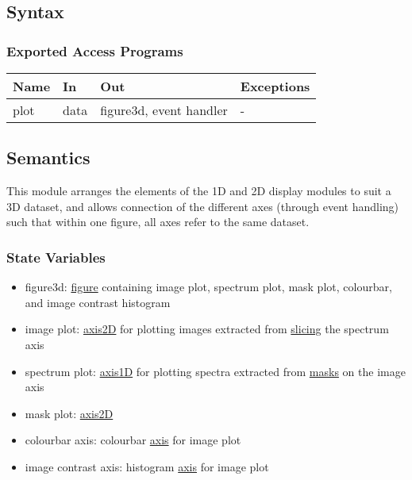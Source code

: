 \documentclass[12pt, titlepage]{article}
\begin{document}
\subsection{Syntax}

\subsubsection{Exported Access Programs}

\begin{center}
    \begin{tabular}{p{2cm} p{3cm} p{5cm} p{2cm}}
        \hline
        \textbf{Name} & \textbf{In} & \textbf{Out} & \textbf{Exceptions} \\
        \hline
        plot & data & figure3d, event handler & - \\
        \hline
    \end{tabular}
\end{center}

\subsection{Semantics}
This module arranges the elements of the 1D and 2D display modules to suit a 3D
dataset, and allows connection of the different axes (through event handling)
such that within one figure, all axes refer to the same dataset.

\subsubsection{State Variables}
\begin{itemize}
    \item figure3d: \hyperref[Mod:Plotting]{figure} containing image plot,
    spectrum plot, mask plot, colourbar, and image contrast histogram
    \item image plot: \hyperref[Mod:Plotting]{axis2D} for plotting images extracted
    from \hyperref[Mod:Slice1D]{slicing} the spectrum axis
    \item spectrum plot: \hyperref[Mod:Plotting]{axis1D} for plotting spectra
    extracted from \hyperref[Mod:Mask2D]{masks} on the image axis
    \item mask plot: \hyperref[Mod:Plotting]{axis2D}
    \item colourbar axis: colourbar \hyperref[Mod:Plotting]{axis} for image plot
    \item image contrast axis: histogram \hyperref[Mod:Plotting]{axis} for image
    plot
\end{itemize}
\end{document}
